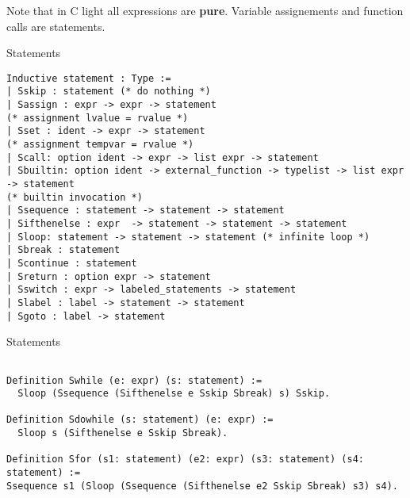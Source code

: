 \documentclass{beamer}
\begin{document}
\begin{frame}

Note that in C light all expressions are {\bf pure}. Variable assignements and function calls are statements.
    
\end{frame}

\begin{frame}[fragile]{Statements}

  \begin{lstlisting}[language=Coq]
Inductive statement : Type :=
| Sskip : statement (* do nothing *)
| Sassign : expr -> expr -> statement
(* assignment lvalue = rvalue *)
| Sset : ident -> expr -> statement
(* assignment tempvar = rvalue *)
| Scall: option ident -> expr -> list expr -> statement
| Sbuiltin: option ident -> external_function -> typelist -> list expr -> statement
(* builtin invocation *)
| Ssequence : statement -> statement -> statement
| Sifthenelse : expr  -> statement -> statement -> statement
| Sloop: statement -> statement -> statement (* infinite loop *)
| Sbreak : statement
| Scontinue : statement
| Sreturn : option expr -> statement
| Sswitch : expr -> labeled_statements -> statement
| Slabel : label -> statement -> statement
| Sgoto : label -> statement

  \end{lstlisting}
  


\end{frame}



\begin{frame}[fragile]{Statements}

  \begin{lstlisting}[language=Coq]
    
Definition Swhile (e: expr) (s: statement) :=
  Sloop (Ssequence (Sifthenelse e Sskip Sbreak) s) Sskip.

Definition Sdowhile (s: statement) (e: expr) :=
  Sloop s (Sifthenelse e Sskip Sbreak).

Definition Sfor (s1: statement) (e2: expr) (s3: statement) (s4: statement) :=
Ssequence s1 (Sloop (Ssequence (Sifthenelse e2 Sskip Sbreak) s3) s4).

  \end{lstlisting}
  


\end{frame}
\end{document}
